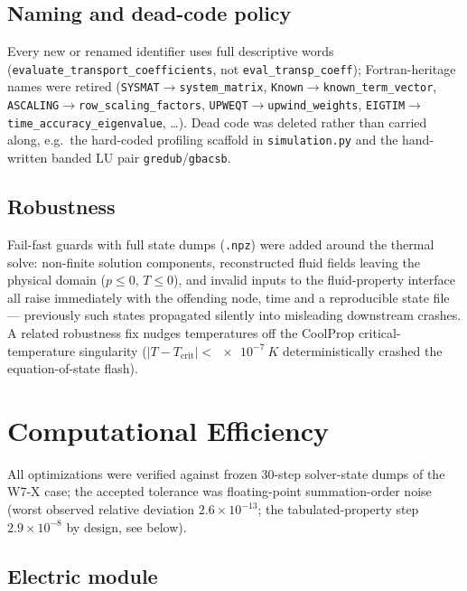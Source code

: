 \documentclass[11pt,a4paper]{article}
\newcommand{\code}[1]{\texttt{#1}}
\begin{document}
\subsection{Naming and dead-code policy}

Every new or renamed identifier uses full descriptive words
(\code{evaluate\_transport\_coefficients}, not \code{eval\_transp\_coeff});
Fortran-heritage names were retired (\code{SYSMAT}$\to$\code{system\_matrix},
\code{Known}$\to$\code{known\_term\_vector},
\code{ASCALING}$\to$\code{row\_scaling\_factors},
\code{UPWEQT}$\to$\code{upwind\_weights}, \code{EIGTIM}$\to$%
\code{time\_accuracy\_eigenvalue}, \ldots). Dead code was deleted rather than carried
along, e.g.\ the hard-coded profiling scaffold in \code{simulation.py} and the
hand-written banded LU pair \code{gredub}/\code{gbacsb}.

\subsection{Robustness}

Fail-fast guards with full state dumps (\code{.npz}) were added around the thermal
solve: non-finite solution components, reconstructed fluid fields leaving the physical
domain ($p \le 0$, $T \le 0$), and invalid inputs to the fluid-property interface all
raise immediately with the offending node, time and a reproducible state file ---
previously such states propagated silently into misleading downstream crashes.
A related robustness fix nudges temperatures off the CoolProp critical-temperature
singularity ($|T - T_\mathrm{crit}| < \SI{e-7}{K}$ deterministically crashed the
equation-of-state flash).

\section{Computational Efficiency}
\label{sec:efficiency}

All optimizations were verified against frozen 30-step solver-state dumps of the
W7-X case; the accepted tolerance was floating-point summation-order noise
(worst observed relative deviation $2.6\times10^{-13}$; the tabulated-property step
$2.9\times10^{-8}$ by design, see below).

\subsection{Electric module}
\end{document}
